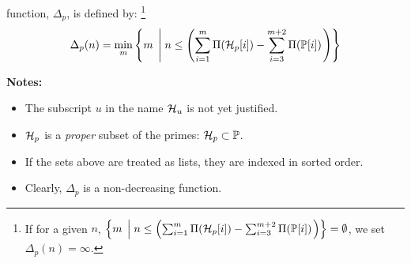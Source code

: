 \documentclass{article}
\theoremstyle{definition}
\begin{document}
 function, $\Delta_p$, is defined by:%
\footnote{If for a given $n$, 
$\left\{ m \; \left| \; n \le \left( \sum_{i=1}^m \Pi({\cal H}_p[i]) - \sum_{i=3}^{m+2} \Pi(\mathbb{P}[i]) \right. \right) \right\} = \emptyset$, we set $\Delta_p(n) = \infty$.}
\begin{eqnarray}
\Delta_p(n) = \mathop{\rm min}\limits_{m} \left\{ m \; \left| \; n \le \left( \sum_{i=1}^m \Pi({\cal H}_p[i]) - \sum_{i=3}^{m+2} \Pi(\mathbb{P}[i])\right. \right) \right\} 
\end{eqnarray}

{\bf Notes:} 
\begin{itemize}
  \item{The subscript $u$ in the name ${\cal H}_u$ is not yet justified.}
  \item{${\cal H}_p$ is a {\em proper\/} subset of the primes: ${\cal H}_p \subset \mathbb{P}$.}
  \item{If the sets above are treated as lists, they are indexed in sorted order.}
  \item{Clearly, $\Delta_p$ is a non-decreasing function.}
\end{itemize}
\end{document}
